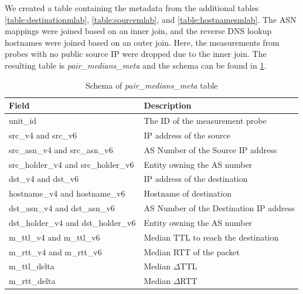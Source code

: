 \FloatBarrier

We created a table containing the metadata from the additional tables \cref{table:destinationmlab}, \cref{table:sourcemlab}, and \cref{table:hostnamesmlab}. The ASN mappings were joined based on an inner join, and the reverse DNS lookup hostnames were joined based on an outer join. Here, the measurements from probes with no public source IP were dropped due to the inner join. The resulting table is \textit{pair\_medians\_meta} and the schema can be found in \cref{table:pairmetamlab}.  

\begin{table}[!h]
	\centering
	\caption{Schema of \textit{pair\_medians\_meta} table}
	\label{table:pairmetamlab}
	\begin{tabular}{lp{8cm}}
  		\toprule
  		\textbf{Field} & \textbf{Description} \\ 
  		\midrule
  		unit\_id & The ID of the measurement probe \\ 
		src\_v4 and src\_v6 &  IP address of the source \\
		src\_asn\_v4 and src\_asn\_v6 & AS Number of the Source IP address \\
		src\_holder\_v4 and src\_holder\_v6 & Entity owning the AS number \\ 
		dst\_v4 and dst\_v6 & IP address of the destination \\
		hostname\_v4 and hostname\_v6 & Hostname of destination \\ 
		dst\_asn\_v4 and dst\_asn\_v6 & AS Number of the Destination IP address \\
		dst\_holder\_v4 and dst\_holder\_v6 & Entity owning the AS number  \\
		m\_ttl\_v4 and m\_ttl\_v6 & Median TTL to reach the destination \\ 
		m\_rtt\_v4 and m\_rtt\_v6 & Median RTT of the packet \\
		m\_ttl\_delta & Median $\Delta$TTL \\
		m\_rtt\_delta & Median $\Delta$RTT \\
  		\bottomrule
\end{tabular}
\end{table}


\begin{verbatim}

\end{verbatim}